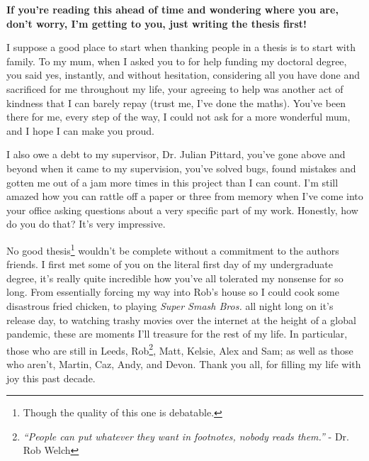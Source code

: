 

\begin{acknowledgements}      %

\setlength{\parindent}{17.62482pt}
\setlength{\parskip}{0.0pt plus 1.0pt}

\textbf{If you're reading this ahead of time and wondering where you are, don't worry, I'm getting to you, just writing the thesis first!}

I suppose a good place to start when thanking people in a thesis is to start with family.
To my mum, when I asked you to for help funding my doctoral degree, you said yes, instantly, and without hesitation, considering all you have done and sacrificed for me throughout my life, your agreeing to help was another act of kindness that I can barely repay (trust me, I've done the maths).
You've been there for me, every step of the way, I could not ask for a more wonderful mum, and I hope I can make you proud.

I also owe a debt to my supervisor, Dr. Julian Pittard, you've gone above and beyond when it came to my supervision, you've solved bugs, found mistakes and gotten me out of a jam more times in this project than I can count.
I'm still amazed how you can rattle off a paper or three from memory when I've come into your office asking questions about a very specific part of my work.
Honestly, how do you do that? It's very impressive.

No good thesis\footnote{Though the quality of this one is debatable.} wouldn't be complete without a commitment to the authors friends.
I first met some of you on the literal first day of my undergraduate degree, it's really quite incredible how you've all tolerated my nonsense for so long.
From essentially forcing my way into Rob's house so I could cook some disastrous fried chicken, to playing \textit{Super Smash Bros.} all night long on it's release day, to watching trashy movies over the internet at the height of a global pandemic, these are moments I'll treasure for the rest of my life.
In particular, those who are still in Leeds, Rob\footnote{\emph{``People can put whatever they want in footnotes, nobody reads them.''} - Dr. Rob Welch}, Matt, Kelsie, Alex and Sam; as well as those who aren't, Martin, Caz, Andy, and Devon.
Thank you all, for filling my life with joy this past decade.


\end{acknowledgements}
